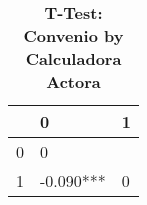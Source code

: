 \begin{table}[H]\centering \caption{\textbf{T-Test: Convenio by Calculadora Actora}}
\begin{tabular}{l*{2}{l}}
\toprule
                     & 0            & 1\\\midrule
0             &      0                   \\
1             & -0.090***    &      0    \\
\bottomrule\end{tabular}
\end{table}
